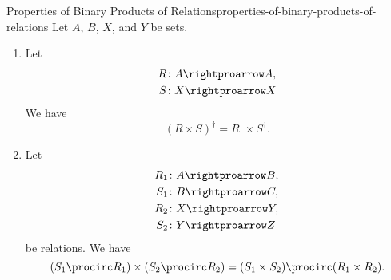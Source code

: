 \begin{proposition}{Properties of Binary Products of Relations}{properties-of-binary-products-of-relations}%
    Let $A$, $B$, $X$, and $Y$ be sets.
    \begin{enumerate}
        \item\label{properties-of-binary-products-of-relations-interaction-with-inverses}Let
            \begin{align*}
                R &\colon A\rightproarrow A,\\
                S &\colon X\rightproarrow X
            \end{align*}
            We have
            \[
                (R\times S)^{\dagger}
                =
                R^{\dagger}\times S^{\dagger}.
            \]%
        \item\label{properties-of-binary-products-of-relations-interaction-with-composition}Let
            \begin{align*}
                R_{1} &\colon A\rightproarrow B,\\
                S_{1} &\colon B\rightproarrow C,\\
                R_{2} &\colon X\rightproarrow Y,\\
                S_{2} &\colon Y\rightproarrow Z
            \end{align*}
            be relations. We have
            \[
                (S_{1}\procirc R_{1})\times(S_{2}\procirc R_{2})%
                =%
                (S_{1}\times S_{2})\procirc(R_{1}\times R_{2}).%
            \]%
    \end{enumerate}
\end{proposition}
